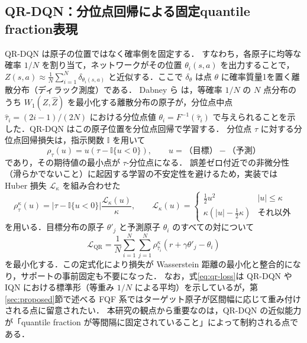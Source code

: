 \documentclass[a4paper,10pt]{jsarticle}
\theoremstyle{definition}
\newcommand{\Wone}{W_1}
\newcommand{\Finv}{F^{-1}}
\begin{document}
\subsection{QR-DQN：分位点回帰による固定quantile fraction表現}
QR-DQN \cite{dabney2018qrdqn} は原子の位置ではなく確率側を固定する．
すなわち，各原子に均等な確率 $1/N$ を割り当て，ネットワークがその位置 $\theta_i(s,a)$ を出力することで，$Z(s,a)\approx\frac1N\sum_{i=1}^N\delta_{\theta_i(s,a)}$ と近似する．ここで $\delta_\theta$ は点 $\theta$ に確率質量1を置く離散分布（ディラック測度）である．
Dabney ら \cite{dabney2018qrdqn} は，等確率 $1/N$ の $N$ 点分布のうち $\Wone(Z,\hat Z)$ を最小化する離散分布の原子が，分位点中点 $\hat\tau_i=(2i-1)/(2N)$ における分位点値
$\theta_i=\Finv(\hat\tau_i)$ で与えられることを示した．QR-DQN はこの原子位置を分位点回帰で学習する．
分位点 $\tau$ に対する分位点回帰損失は，指示関数 $\mathbb{I}$ を用いて
\begin{equation}
  \rho_\tau(u)=u\left(\tau-\mathbb{I}\{u<0\}\right),\qquad u=\text{（目標）}-\text{（予測）}
\end{equation}
であり，その期待値の最小点が $\tau$-分位点になる．
誤差ゼロ付近での非微分性（滑らかでないこと）に起因する学習の不安定性を避けるため，実装では Huber 損失 $\mathcal{L}_\kappa$ を組み合わせた
\begin{equation}
  \rho^\kappa_\tau(u)=\left|\tau-\mathbb{I}\{u<0\}\right|\frac{\mathcal{L}_\kappa(u)}{\kappa},\qquad
  \mathcal{L}_\kappa(u)=\begin{cases}\tfrac12u^2 & |u|\le\kappa\\ \kappa(|u|-\tfrac12\kappa)& \text{それ以外}\end{cases}
  \label{eq:huber-quantile}
\end{equation}
を用いる．目標分布の原子 $\theta'_j$ と予測原子 $\theta_i$ のすべての対について
\begin{equation}
  \mathcal{L}_{\mathrm{QR}}=\frac1N\sum_{i=1}^N\sum_{j=1}^N\rho^\kappa_{\hat\tau_i}\!\left(r+\gamma\theta'_j-\theta_i\right)
  \label{eq:qr-loss}
\end{equation}
を最小化する．この定式化により損失が Wasserstein 距離の最小化と整合的になり，サポートの事前固定も不要になった．
なお，式\eqref{eq:qr-loss}は QR-DQN や IQN における標準形（等重み $1/N$ による平均）を示しているが，第\ref{sec:proposed}節で述べる FQF 系ではターゲット原子が区間幅に応じて重み付けされる点に留意されたい．
本研究の観点から重要なのは，QR-DQN の近似能力が「quantile fraction が等間隔に固定されていること」によって制約される点である．
\end{document}
